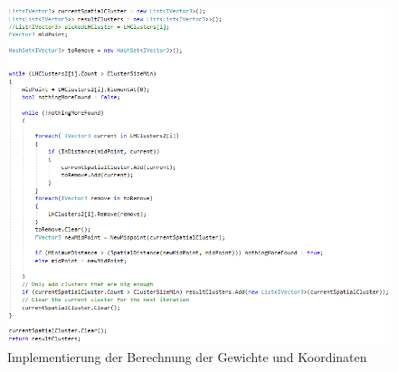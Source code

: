 \begin{figure}[!h] 
\includegraphics[width=1.2\textwidth]{Logos/Spatial_Code.PNG}
\caption{Implementierung der Berechnung der Gewichte und Koordinaten} 
\label{fig:spatclust_code} 
\end{figure}


